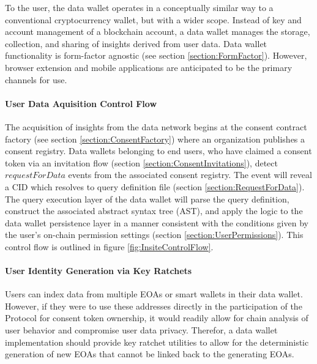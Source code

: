 To the user, the data wallet operates in a conceptually similar way to a conventional cryptocurrency wallet, but with a wider scope. 
Instead of key and account management of a blockchain account, a data wallet manages the storage, collection, and sharing of insights derived 
from user data. Data wallet functionality is form-factor agnostic (see section \ref{section:FormFactor}). However, browser extension and 
mobile applications are anticipated to be the primary channels for use.

\paragraph{User Data Aquisition Control Flow}
\label{section:AquisitionControlFlow}



The acquisition of insights from the data network begins at the consent contract factory (see section \ref{section:ConsentFactory}) where an organization 
publishes a consent registry. Data wallets belonging to end users, who have claimed a consent token via an invitation flow (section \ref{section:ConsentInvitations}),
detect $requestForData$ events from the associated consent registry. The event will reveal a CID which resolves to query definition file (section \ref{section:RequestForData}). 
The query execution layer of the data wallet will parse the query definition, construct the associated abstract syntax tree (AST), and apply the logic to the
data wallet persistence layer in a manner consistent with the conditions given by the user's on-chain permission settings (section \ref{section:UserPermissions}). This
control flow is outlined in figure \ref{fig:InsiteControlFlow}.

\paragraph{User Identity Generation via Key Ratchets}
\label{section:UserIdentityGeneration}

Users can index data from multiple EOAs or smart wallets in their data wallet. However, if they were to use these addresses directly in the participation of 
the Protocol for consent token ownership, it would readily allow for chain analysis of user behavior and compromise user data privacy. Therefor, a data wallet
implementation should provide key ratchet utilities to allow for the deterministic generation of new EOAs that cannot be linked back to the generating EOAs. 

